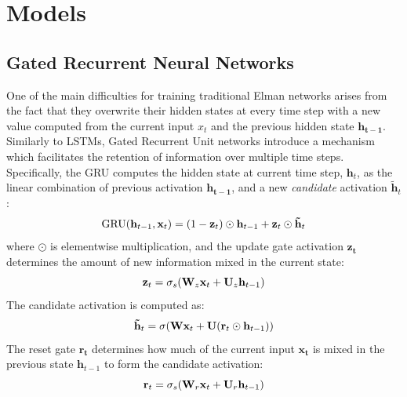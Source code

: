 \section{Models}

\subsection{Gated Recurrent Neural Networks}
\label{sec:gru}

One of the main difficulties for training traditional Elman networks
arises from the fact that they overwrite their hidden states at every
time step with a new value computed from the current input $x_{t}$ and
the previous hidden state $\mathbf{h_{t-1}}$. Similarly to LSTMs,
Gated Recurrent Unit networks introduce a mechanism which facilitates the retention of 
information over multiple time steps.
Specifically, the GRU computes the hidden state at current time step, $\mathbf{h}_{t}$, as the
linear combination of previous activation $\mathbf{h_{t-1}}$, and a new
{\it candidate} activation $\mathbf{\tilde{h}}_t$:
%
\vspace{-.2cm}
\begin{equation}
  \mathrm{GRU}(\mathbf{h}_{t-1}, \mathbf{x}_t) = (1 - \mathbf{z}_t)\odot \mathbf{h}_{t-1} + \mathbf{z}_t \odot \mathbf{\tilde{h}}_t
\vspace{-.1cm}
\end{equation}
%
where $\odot$ is elementwise multiplication, and the update gate
activation $\mathbf{z_{t}}$ determines the amount of new information
mixed in the current state:
%
\vspace{-.1cm}
\begin{equation}
\label{eq:gru-update}
   \mathbf{z}_t = \sigma_s(\mathbf{W}_z \mathbf{x}_t + \mathbf{U}_z \mathbf{h}_{t-1})
\vspace{-.1cm}
\end{equation}
%
The candidate activation is computed as:
%
\vspace{-.2cm}
\begin{equation}
\label{eq:gru-cand}
   \mathbf{\tilde{h}}_t = \sigma(\mathbf{W} \mathbf{x}_t + \mathbf{U}(\mathbf{r}_t \odot \mathbf{h}_{t-1}))
\vspace{-.1cm}
\end{equation}
%
The reset gate $\mathbf{r_{t}}$ determines how much of the current
input $\mathbf{x_{t}}$ is mixed in the previous state
$\mathbf{h}_{t-1}$ to form the candidate activation:
%
\vspace{-.2cm}
\begin{equation}
\label{eq:gru-reset}
   \mathbf{r}_t = \sigma_s(\mathbf{W}_r \mathbf{x}_t + \mathbf{U}_r \mathbf{h}_{t-1})
\vspace{-.1cm}
\end{equation}

